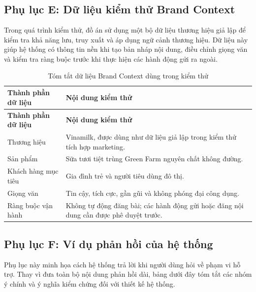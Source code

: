 \documentclass[a4paper]{article}
\renewcommand{\arraystretch}{1.25}
\begin{document}
\subsection*{Phụ lục E: Dữ liệu kiểm thử Brand Context}

Trong quá trình kiểm thử, đồ án sử dụng một bộ dữ liệu thương hiệu giả lập để kiểm tra khả năng lưu, truy xuất và áp dụng ngữ cảnh thương hiệu. Dữ liệu này giúp hệ thống có thông tin nền khi tạo bản nháp nội dung, điều chỉnh giọng văn và kiểm tra ràng buộc trước khi thực hiện các hành động gửi ra ngoài.

\renewcommand{\arraystretch}{1.25}
\begin{longtable}{L{0.30\textwidth}L{0.60\textwidth}}
\caption{Tóm tắt dữ liệu Brand Context dùng trong kiểm thử}\\
\toprule
\textbf{Thành phần dữ liệu} & \textbf{Nội dung kiểm thử}\\
\midrule
\endfirsthead
\toprule
\textbf{Thành phần dữ liệu} & \textbf{Nội dung kiểm thử}\\
\midrule
\endhead
Thương hiệu & Vinamilk, được dùng như dữ liệu giả lập trong kiểm thử tích hợp marketing.\\
Sản phẩm & Sữa tươi tiệt trùng Green Farm nguyên chất không đường.\\
Khách hàng mục tiêu & Gia đình trẻ và người tiêu dùng đô thị.\\
Giọng văn & Tin cậy, tích cực, gần gũi và không phóng đại công dụng.\\
Ràng buộc vận hành & Không tự động đăng bài; các hành động gửi hoặc đăng nội dung cần được phê duyệt trước.\\
\bottomrule
\end{longtable}
\renewcommand{\arraystretch}{1}

\subsection*{Phụ lục F: Ví dụ phản hồi của hệ thống}

Phụ lục này minh họa cách hệ thống trả lời khi người dùng hỏi về phạm vi hỗ trợ. Thay vì đưa toàn bộ nội dung phản hồi dài, bảng dưới đây tóm tắt các nhóm ý chính và ý nghĩa kiểm chứng đối với thiết kế hệ thống.
\end{document}
